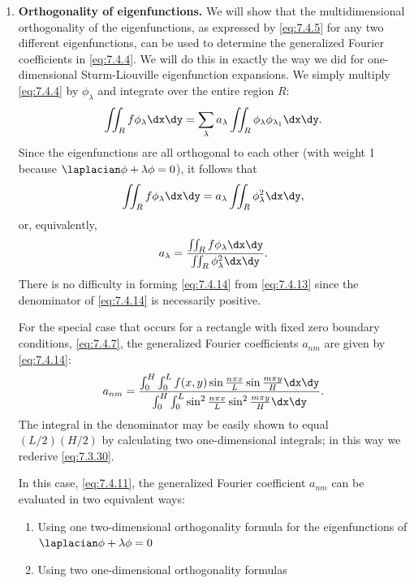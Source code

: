 \begin{enumerate}
\item[5.] \textbf{Orthogonality of eigenfunctions.}  We will show that the multidimensional orthogonality of the eigenfunctions, as expressed by \eqref{eq:7.4.5} for any two different eigenfunctions, can be used to determine the generalized Fourier coefficients in \eqref{eq:7.4.4}.  We will do this in exactly the way we did for one-dimensional Sturm-Liouville eigenfunction expansions.  We simply multiply \eqref{eq:7.4.4} by $\phi_\lambda$ and integrate over the entire region $R$:
\begin{equation}
\iint_R f\phi_\lambda\dx\dy = \sum_\lambda a_\lambda \iint_R \phi_\lambda\phi_{\lambda_1}\dx\dy.
\label{eq:7.4.12}
\end{equation}
Since the eigenfunctions are all orthogonal to each other (with weight 1 because $\laplacian\phi + \lambda\phi = 0$), it follows that
\begin{equation}
\iint_R f\phi_\lambda\dx\dy = a_\lambda \iint_R \phi_\lambda^2\dx\dy,
\label{eq:7.4.13}
\end{equation}
or, equivalently,
\begin{equation}
a_\lambda = \frac{\iint_R f\phi_\lambda\dx\dy}{\iint_R \phi_\lambda^2\dx\dy}.
\label{eq:7.4.14}
\end{equation}
There is no difficulty in forming \eqref{eq:7.4.14} from \eqref{eq:7.4.13} since the denominator of \eqref{eq:7.4.14} is necessarily positive.

For the special case that occurs for a rectangle with fixed zero boundary conditions, \eqref{eq:7.4.7}, the generalized Fourier coefficients $a_{nm}$ are given by \eqref{eq:7.4.14}:
\begin{equation}
a_{nm} = \frac{\int_0^H\int_0^L f(x,y)\sin\frac{n\pi x}{L}\sin\frac{m\pi y}{H}\dx\dy}{\int_0^H\int_0^L \sin^2\frac{n\pi x}{L}\sin^2\frac{m\pi y}{H}\dx\dy}.
\label{eq:7.4.15}
\end{equation}
The integral in the denominator may be easily shown to equal $(L/2)(H/2)$ by calculating two one-dimensional integrals; in this way we rederive \eqref{eq:7.3.30}.

In this case, \eqref{eq:7.4.11}, the generalized Fourier coefficient $a_{nm}$ can be evaluated in two equivalent ways:

\begin{enumerate}
\item[(a)] Using one two-dimensional orthogonality formula for the eigenfunctions of $\laplacian\phi + \lambda\phi = 0$
\item[(b)] Using two one-dimensional orthogonality formulas
\end{enumerate}


\end{enumerate}
